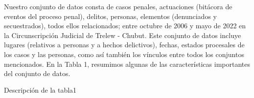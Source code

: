Nuestro conjunto de datos consta de casos penales, actuaciones (bitácora de eventos del proceso penal), delitos, personas, elementos (denunciados y secuestrados), todos ellos relacionados; entre octubre de 2006 y mayo de 2022 en la Circunscripción Judicial de Trelew - Chubut. Este conjunto de datos incluye lugares (relativos a personas y a hechos delictivos), fechas, estados procesales de los casos y las personas, como así también los vínculos entre todos los conjuntos mencionados. En la Tabla 1, resumimos algunas de las características importantes del conjunto de datos.
\begin{table}
	\caption{Descripción de la tabla1}\label{tab3}
\end{table}
